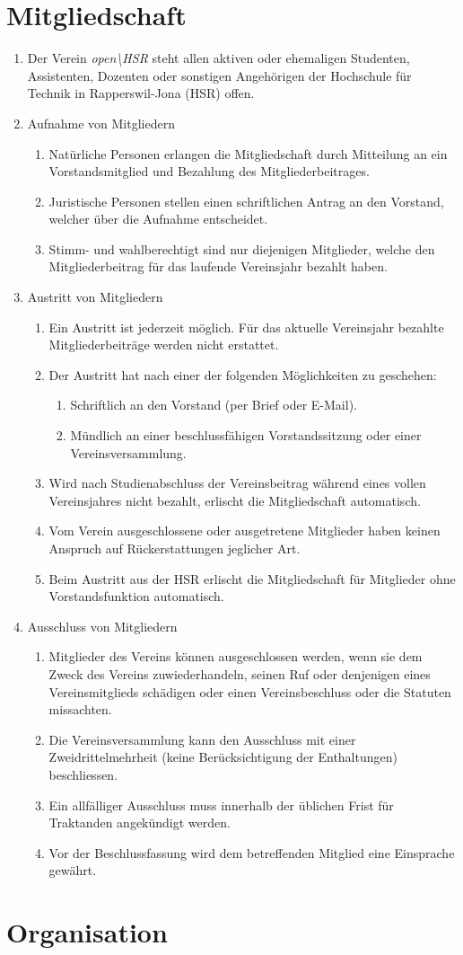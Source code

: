 \documentclass[10pt,a4paper,parskip,fleqn]{scrartcl}
\newcommand{\ol}{\begin{enumerate}[itemsep=-0.2em,topsep=-0.2em]}
\newcommand{\lo}{\end{enumerate}}
\newcommand{\li}{\item}
\begin{document}
\section{Mitgliedschaft}

\ol
  \li Der Verein \textit{open\textbackslash{}HSR} steht allen aktiven oder ehemaligen
  Studenten, Assistenten, Dozenten oder sonstigen Angehörigen der Hochschule für
  Technik in Rapperswil-Jona (HSR) offen.
  \li Aufnahme von Mitgliedern
    \ol
      \li Natürliche Personen erlangen die Mitgliedschaft durch Mitteilung an
      ein Vorstandsmitglied und Bezahlung des Mitgliederbeitrages.
      \li Juristische Personen stellen einen schriftlichen Antrag an den
      Vorstand, welcher über die Aufnahme entscheidet.
      \li Stimm- und wahlberechtigt sind nur diejenigen Mitglieder, welche den
      Mitgliederbeitrag für das laufende Vereinsjahr bezahlt haben.
    \lo
  \li Austritt von Mitgliedern
    \ol
      \li Ein Austritt ist jederzeit möglich. Für das aktuelle Vereinsjahr
      bezahlte Mitgliederbeiträge werden nicht erstattet.
      \li Der Austritt hat nach einer der folgenden Möglichkeiten zu geschehen:
        \ol
          \li Schriftlich an den Vorstand (per Brief oder E-Mail).
          \li Mündlich an einer beschlussfähigen Vorstandssitzung oder einer
           Vereinsversammlung.
        \lo
      \li Wird nach Studienabschluss der Vereinsbeitrag während eines vollen
      Vereinsjahres nicht bezahlt, erlischt die Mitgliedschaft automatisch.
      \li Vom Verein ausgeschlossene oder ausgetretene Mitglieder haben keinen
      Anspruch auf Rückerstattungen jeglicher Art.
      \li Beim Austritt aus der HSR erlischt die Mitgliedschaft für Mitglieder
      ohne Vorstandsfunktion automatisch.
    \lo
  \li{Ausschluss von Mitgliedern}
    \ol
      \li Mitglieder des Vereins können ausgeschlossen werden, wenn sie dem
      Zweck des Vereins zuwiederhandeln, seinen Ruf oder denjenigen eines
      Vereinsmitglieds schädigen oder einen Vereinsbeschluss oder die Statuten
      missachten.
      \li Die Vereinsversammlung kann den Ausschluss mit einer
      Zweidrittelmehrheit (keine Berücksichtigung der Enthaltungen)
      beschliessen.
      \li Ein allfälliger Ausschluss muss innerhalb der üblichen Frist für
      Traktanden angekündigt werden.
      \li Vor der Beschlussfassung wird dem betreffenden Mitglied eine
      Einsprache gewährt.
    \lo
\lo


\section{Organisation}
\end{document}
